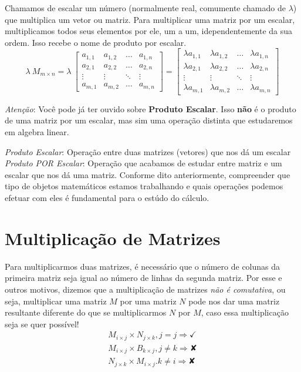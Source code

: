 \documentclass[
  letterpaper,
  DIV=11,
  numbers=noendperiod]{scrreprt}
\begin{document}
Chamamos de escalar um número (normalmente real, comumente chamado de
\(\lambda\)) que multiplica um vetor ou matriz. Para multiplicar uma
matriz por um escalar, multiplicamos todos seus elementos por ele, um a
um, idependentemente da sua ordem. Isso recebe o nome de produto por
escalar. \[
\lambda~ M_{m\times n}=
\lambda~
\begin{bmatrix}
    a_{1,1} & a_{1,2} & \dots & a_{1,n} \\
    a_{2,1} & a_{2,2} & \dots & a_{2,n} \\
    \vdots  & \vdots & \ddots & \vdots \\
    a_{m,1} & a_{m,2} & \dots & a_{m,n}
\end{bmatrix}
=
\begin{bmatrix}
    \lambda a_{1,1} & \lambda a_{1,2} & \dots & \lambda a_{1,n} \\
    \lambda a_{2,1} & \lambda a_{2,2} & \dots & \lambda a_{2,n} \\
    \vdots  & \vdots & \ddots & \vdots \\
    \lambda a_{m,1} & \lambda a_{m,2} & \dots & \lambda a_{m,n}
\end{bmatrix}
\]

\emph{Atenção}: Você pode já ter ouvido sobre \textbf{Produto Escalar}.
Isso \textbf{não} é o produto de uma matriz por um escalar, mas sim uma
operação distinta que estudaremos em algebra linear.

\emph{Produto Escalar}: Operação entre duas matrizes (vetores) que nos
dá um escalar \emph{Produto POR Escalar}: Operação que acabamos de
estudar entre matriz e um escalar que nos dá uma matriz. Conforme dito
anteriormente, compreender que tipo de objetos matemáticos estamos
trabalhando e quais operações podemos efetuar com eles é fundamental
para o estúdo do cálculo.

\section{Multiplicação de
Matrizes}\label{multiplicauxe7uxe3o-de-matrizes}

Para multiplicarmos duas matrizes, é necessário que o número de colunas
da primeira matriz seja igual ao número de linhas da segunda matriz. Por
esse e outros motivos, dizemos que a multiplicação de matrizes \emph{não
é comutativa}, ou seja, multiplicar uma matriz \(M\) por uma matriz
\(N\) pode nos dar uma matriz resultante diferente do que se
multiplicarmos \(N\) por \(M\), caso essa multiplicação seja se quer
possível! \[
\begin{aligned}
    M_{i\times j} \times N_{j\times k}, j=j \Rightarrow \checkmark \\
    M_{i\times j} \times B_{k\times j}, j\neq k \Rightarrow ✘ \\
    N_{j\times k} \times M_{i\times j}. k\neq i \Rightarrow ✘
\end{aligned}
\]
\end{document}
